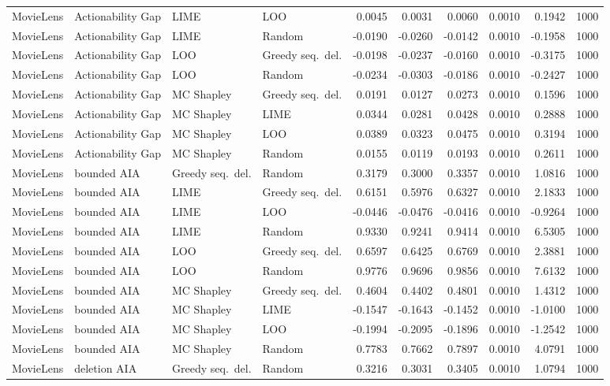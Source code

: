 \begin{longtable}{@{}p{}p{}p{}p{}rrrrrr@{}}
MovieLens & Actionability Gap & LIME & LOO & 0.0045 & 0.0031 & 0.0060 & 0.0010 & 0.1942 & 1000 \\
MovieLens & Actionability Gap & LIME & Random & -0.0190 & -0.0260 & -0.0142 & 0.0010 & -0.1958 & 1000 \\
MovieLens & Actionability Gap & LOO & Greedy seq.\ del. & -0.0198 & -0.0237 & -0.0160 & 0.0010 & -0.3175 & 1000 \\
MovieLens & Actionability Gap & LOO & Random & -0.0234 & -0.0303 & -0.0186 & 0.0010 & -0.2427 & 1000 \\
MovieLens & Actionability Gap & MC Shapley & Greedy seq.\ del. & 0.0191 & 0.0127 & 0.0273 & 0.0010 & 0.1596 & 1000 \\
MovieLens & Actionability Gap & MC Shapley & LIME & 0.0344 & 0.0281 & 0.0428 & 0.0010 & 0.2888 & 1000 \\
MovieLens & Actionability Gap & MC Shapley & LOO & 0.0389 & 0.0323 & 0.0475 & 0.0010 & 0.3194 & 1000 \\
MovieLens & Actionability Gap & MC Shapley & Random & 0.0155 & 0.0119 & 0.0193 & 0.0010 & 0.2611 & 1000 \\
MovieLens & bounded AIA & Greedy seq.\ del. & Random & 0.3179 & 0.3000 & 0.3357 & 0.0010 & 1.0816 & 1000 \\
MovieLens & bounded AIA & LIME & Greedy seq.\ del. & 0.6151 & 0.5976 & 0.6327 & 0.0010 & 2.1833 & 1000 \\
MovieLens & bounded AIA & LIME & LOO & -0.0446 & -0.0476 & -0.0416 & 0.0010 & -0.9264 & 1000 \\
MovieLens & bounded AIA & LIME & Random & 0.9330 & 0.9241 & 0.9414 & 0.0010 & 6.5305 & 1000 \\
MovieLens & bounded AIA & LOO & Greedy seq.\ del. & 0.6597 & 0.6425 & 0.6769 & 0.0010 & 2.3881 & 1000 \\
MovieLens & bounded AIA & LOO & Random & 0.9776 & 0.9696 & 0.9856 & 0.0010 & 7.6132 & 1000 \\
MovieLens & bounded AIA & MC Shapley & Greedy seq.\ del. & 0.4604 & 0.4402 & 0.4801 & 0.0010 & 1.4312 & 1000 \\
MovieLens & bounded AIA & MC Shapley & LIME & -0.1547 & -0.1643 & -0.1452 & 0.0010 & -1.0100 & 1000 \\
MovieLens & bounded AIA & MC Shapley & LOO & -0.1994 & -0.2095 & -0.1896 & 0.0010 & -1.2542 & 1000 \\
MovieLens & bounded AIA & MC Shapley & Random & 0.7783 & 0.7662 & 0.7897 & 0.0010 & 4.0791 & 1000 \\
MovieLens & deletion AIA & Greedy seq.\ del. & Random & 0.3216 & 0.3031 & 0.3405 & 0.0010 & 1.0794 & 1000 \\

\end{longtable}
